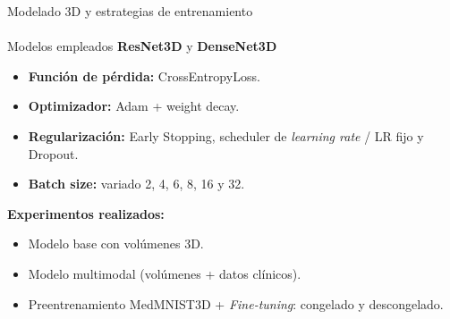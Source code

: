 \documentclass{beamer}
\begin{document}
\begin{frame}{Modelado 3D y estrategias de entrenamiento}
\framesubtitle{\insertsubsectionhead}
\begin{block}{Modelos empleados}
\centering
\textbf{ResNet3D} y \textbf{DenseNet3D}
\end{block}


\begin{itemize}
    \item \textbf{Función de pérdida:} CrossEntropyLoss.
    \item \textbf{Optimizador:} Adam + weight decay.
    \item \textbf{Regularización:} Early Stopping, scheduler de \textit{learning rate} / LR fijo y Dropout.
    \item \textbf{Batch size:} variado 2, 4, 6, 8, 16 y 32.
\end{itemize}

\vspace{0.3em}

\textbf{Experimentos realizados:}
\begin{itemize}
    \item Modelo base con volúmenes 3D.
    \item Modelo multimodal (volúmenes + datos clínicos).
    \item Preentrenamiento MedMNIST3D + \textit{Fine-tuning}: congelado y descongelado.
\end{itemize}

\end{frame}



\end{document}
